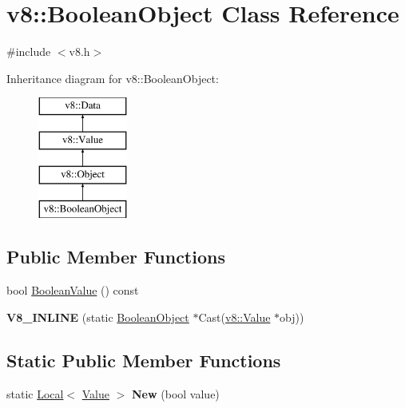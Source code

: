 \hypertarget{classv8_1_1_boolean_object}{}\section{v8\+:\+:Boolean\+Object Class Reference}
\label{classv8_1_1_boolean_object}


{\ttfamily \#include $<$v8.\+h$>$}

Inheritance diagram for v8\+:\+:Boolean\+Object\+:\begin{figure}[H]
\begin{center}
\leavevmode
\includegraphics[height=4.000000cm]{classv8_1_1_boolean_object}
\end{center}
\end{figure}
\subsection*{Public Member Functions}
\begin{DoxyCompactItemize}
\item 
bool \hyperlink{classv8_1_1_boolean_object_a646051d57e93ba1df2ce6c93eef5aec9}{Boolean\+Value} () const 
\item 
\hypertarget{classv8_1_1_boolean_object_a4cee7bf0cbca6368e052d79b613fc6cb}{}{\bfseries V8\+\_\+\+I\+N\+L\+I\+N\+E} (static \hyperlink{classv8_1_1_boolean_object}{Boolean\+Object} $\ast$Cast(\hyperlink{classv8_1_1_value}{v8\+::\+Value} $\ast$obj))\label{classv8_1_1_boolean_object_a4cee7bf0cbca6368e052d79b613fc6cb}

\end{DoxyCompactItemize}
\subsection*{Static Public Member Functions}
\begin{DoxyCompactItemize}
\item 
\hypertarget{classv8_1_1_boolean_object_af57ca9198a6c6d00617da80b3f705e37}{}static \hyperlink{classv8_1_1_local}{Local}$<$ \hyperlink{classv8_1_1_value}{Value} $>$ {\bfseries New} (bool value)\label{classv8_1_1_boolean_object_af57ca9198a6c6d00617da80b3f705e37}

\end{DoxyCompactItemize}


